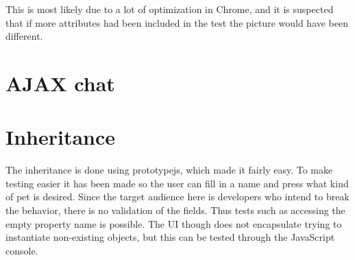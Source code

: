 \documentclass[a4paper,10pt]{article}
\begin{document}
This is most likely due to a lot of optimization in Chrome, and it is
suspected that if more attributes had been included in the test the
picture would have been different.

\section*{AJAX chat}

\section*{Inheritance}
The inheritance is done using prototypejs, which made it fairly easy.
To make testing easier it has been made so the user can fill in a name
and press what kind of pet is desired.  Since the target audience here
is developers who intend to break the behavior, there is no validation
of the fields.  Thus tests such as accessing the empty property name
is possible.  The UI though does not encapsulate trying to instantiate
non-existing objects, but this can be tested through the JavaScript
console.
\end{document}
